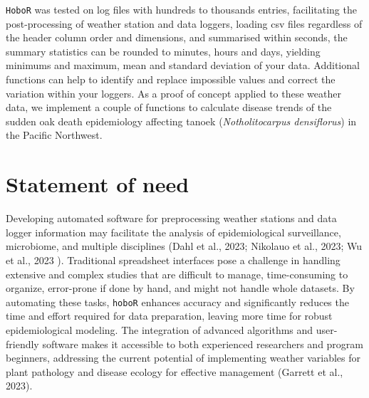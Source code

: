 \documentclass[11pt, oneside]{article}   	%
\begin{document}
\verb|HoboR| was tested on log files with hundreds to thousands entries, facilitating the post-processing of weather station and data loggers, loading csv files regardless of the header column order and dimensions, and summarised within seconds, the summary statistics can be rounded to minutes, hours and days, yielding minimums and maximum, mean and standard deviation of your data. Additional functions can help to identify and replace impossible values and correct the variation within your loggers. As a proof of concept applied to these weather data, we implement a couple of functions to calculate disease trends of the sudden oak death epidemiology affecting tanoek (\emph{Notholitocarpus densiflorus}) in the Pacific Northwest.

\section*{Statement of need}
Developing automated software for preprocessing weather stations and data logger information may facilitate the analysis of epidemiological surveillance, microbiome, and multiple disciplines (Dahl et al., 2023; Nikolauo et al., 2023; Wu et al., 2023 ). Traditional spreadsheet interfaces pose a challenge in handling extensive and complex studies that are difficult to manage, time-consuming to organize, error-prone if done by hand, and might not handle whole datasets. By automating these tasks, \verb|hoboR| enhances accuracy and significantly reduces the time and effort required for data preparation, leaving more time for robust epidemiological modeling. The integration of advanced algorithms and user-friendly software makes it accessible to both experienced researchers and program beginners, addressing the current potential of implementing weather variables for plant pathology and disease ecology for effective management (Garrett et al., 2023).

\end{document}
